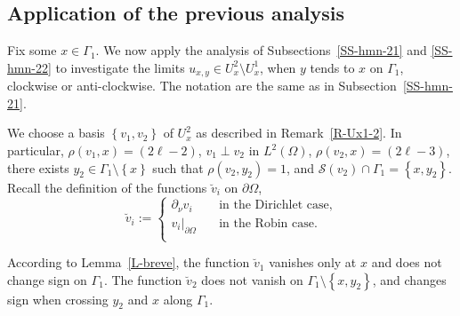 \documentclass[12pt,a4paper]{amsart}
\theoremstyle{plain} %
\theoremstyle{definition}
\numberwithin{equation}{section}
\numberwithin{figure}{section}
\numberwithin{table}{section}
\newcommand{\cS}{\mathcal{S}}
\newcommand{\sm}{\!\setminus\!}
\newcommand{\set}[1]{\left\lbrace #1 \right\rbrace}
\begin{document}
{\subsection{Application of the previous analysis}\label{SS-hmn-24}
Fix some $x \in \Gamma_1$. We now apply the analysis of Subsections~\ref{SS-hmn-21} and \ref{SS-hmn-22} to investigate the limits $u_{x,y} \in U^2_x\sm U^1_x$, when $y$ tends to $x$ on $\Gamma_1$, clockwise or anti-clockwise. The notation are the same as in  Subsection~\ref{SS-hmn-21}.\smallskip

We choose a basis $\set{v_1,v_2}$ of $U^2_x$ as described in Remark~\ref{R-Ux1-2}. In particular, $\rho(v_1,x)=(2\ell -2)$,  $v_1 \perp v_2$ in $L^2(\Omega)$,  $\rho(v_2,x)=(2\ell-3)$, there exists $y_2 \in \Gamma_1\sm \set{x}$ such that $\rho(v_2,y_2)= 1$, and $\cS(v_2) \cap \Gamma_1 = \set{x,y_2}$.
Recall the definition of the functions $\breve{v}_i$ on $\partial \Omega$,
%
\begin{equation}\label{E-bha4-3d}
\breve{v}_i := \left\{
\begin{array}{ll}
\partial_{\nu}v_i &\quad \text{in the Dirichlet case,}\\[5pt]
v_i|_{\partial \Omega} &\quad \text{in the Robin case.}\\[5pt]
\end{array}
\right.
\end{equation}


According to Lemma~\ref{L-breve}, the function $\breve{v}_1$ vanishes only at $x$ and does not change sign on $\Gamma_1$. The function $\breve{v}_2$ does not vanish on $\Gamma_1 \sm \set{x,y_2}$, and changes sign when crossing $y_2$  and $x$ along $\Gamma_1$.\smallskip


}
\end{document}
